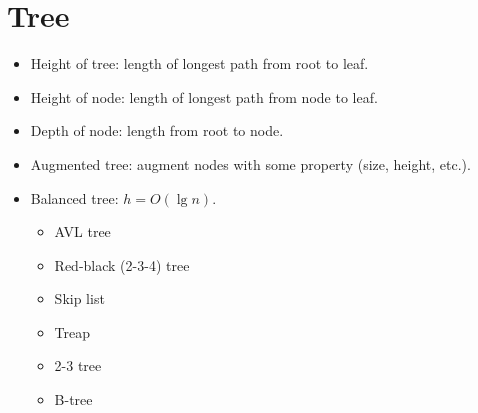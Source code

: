 \documentclass[twocolumn]{article}
\begin{document}

\section{Tree}
\begin{itemize}
\item Height of tree: length of longest path from root to leaf.
\item Height of node: length of longest path from node to leaf.
\item Depth of node: length from root to node.
\item Augmented tree: augment nodes with some property (size, height, etc.).
\item Balanced tree: $h = O(\lg n)$.
  \begin{itemize}
  \item AVL tree
  \item Red-black (2-3-4) tree
  \item Skip list
  \item Treap
  \item 2-3 tree
  \item B-tree
  \end{itemize}
\end{itemize}

\end{document}
